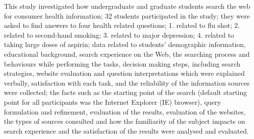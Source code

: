 \documentclass[]{article}
\begin{document}
This study investigated how undergraduate and graduate students search the web for consumer health information; 32 students participated in the study; they were asked to find answers to four health related questions; 1. related to flu shot; 2. related to second-hand smoking; 3. related to major depression; 4. related to taking large doses of aspirin; data related to students' demographic information, educational background, search experience on the Web, the searching process and behaviours while performing the tasks, decision making steps, including search strategies, website evaluation and question interpretations which were explained verbally, satisfaction with each task, and the reliability of the information sources were collected; the facts such as the starting point of the search (default starting point for all participants was the Internet Explorer (IE) browser), query formulation and refinement, evaluation of the results, evaluation of the websites, the types of sources consulted and how the familiarity of the subject impacts on search experience and the satisfaction of the results were analysed and evaluated.
\end{document}
